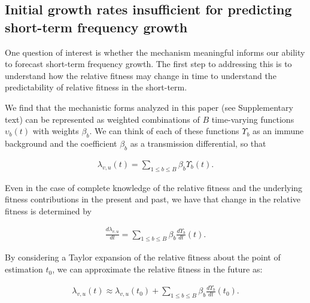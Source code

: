 \documentclass[12pt,oneside,letterpaper]{article}
\def\tbc#1{\textcolor{purple}{[#1]}}
\begin{document}
\subsection*{Initial growth rates insufficient for predicting short-term frequency growth}

One question of interest is whether the mechanism meaningful informs our ability to forecast short-term frequency growth.
The first step to addressing this is to understand how the relative fitness may change in time to understand the predictability of relative fitness in the short-term.

We find that the mechanistic forms analyzed in this paper (see Supplementary text) can be represented as weighted combinations of $B$ time-varying functions $\upsilon_{b}(t)$ with weights $\beta_{b}$.
We can think of each of these functions $\Upsilon_b$ as an immune background and the coefficient $\beta_{b}$ as a transmission differential, so that

\begin{align*}
\lambda_{v,u}(t) = \sum_{1 \leq b \leq B} \beta_{b} \Upsilon_{b}(t).
\end{align*}

Even in the case of complete knowledge of the relative fitness and the underlying fitness contributions in the present and past, we have that change in the relative fitness is determined by

\begin{align*}
    \frac{d\lambda_{v,u}}{dt} = \sum_{1 \leq b \leq B} \beta_{b} \frac{d\Upsilon_{b}}{dt}(t).
\end{align*}

By considering a Taylor expansion of the relative fitness about the point of estimation $t_{0}$, we can approximate the relative fitness in the future as:

\begin{align*}
    \lambda_{v,u}(t) \approx \lambda_{v,u}(t_{0}) + \sum_{1\leq b \leq B} \beta_b \frac{d\Upsilon_b}{dt}(t_0).
\end{align*}
\end{document}
